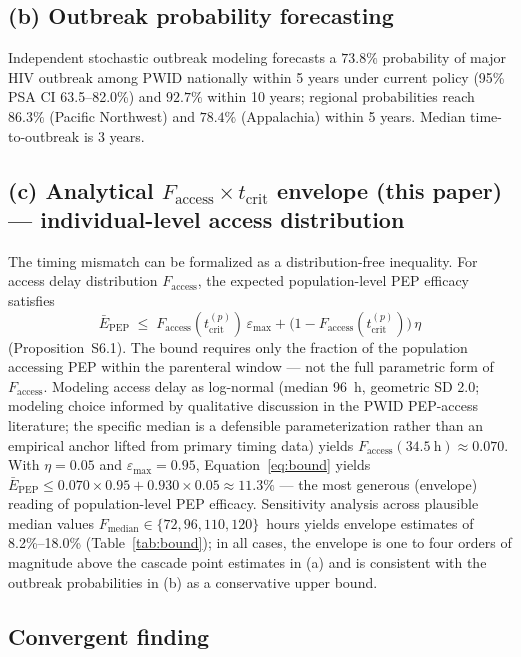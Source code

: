 \documentclass[11pt]{article}
\theoremstyle{definition}
\theoremstyle{remark}
\newcommand{\Ebarpep}{\bar{E}_{\text{PEP}}}
\newcommand{\Faccess}{F_{\text{access}}}
\newcommand{\tcrit}{t_{\text{crit}}}
\newcommand{\emax}{\varepsilon_{\max}}
\begin{document}
\subsection*{(b) Outbreak probability forecasting}

Independent stochastic outbreak modeling\cite{demidont_companion} forecasts a $73.8\%$ probability of major HIV outbreak among PWID nationally within 5 years under current policy (95\% PSA CI 63.5--82.0\%) and $92.7\%$ within 10 years; regional probabilities reach $86.3\%$ (Pacific Northwest) and $78.4\%$ (Appalachia) within 5 years. Median time-to-outbreak is 3 years.

\subsection*{(c) Analytical $\Faccess \times \tcrit$ envelope (this paper) --- individual-level access distribution}

The timing mismatch can be formalized as a distribution-free inequality. For access delay distribution $\Faccess$, the expected population-level PEP efficacy satisfies
\begin{equation}
\Ebarpep \;\leq\; \Faccess(\tcrit^{(p)})\,\emax + \big(1 - \Faccess(\tcrit^{(p)})\big)\,\eta
\label{eq:bound}
\end{equation}
(Proposition~S6.1). The bound requires only the fraction of the population accessing PEP within the parenteral window --- not the full parametric form of $\Faccess$. Modeling access delay as log-normal (median 96~h, geometric SD 2.0; modeling choice informed by qualitative discussion in the PWID PEP-access literature\cite{taylor2019,baugher2025}; the specific median is a defensible parameterization rather than an empirical anchor lifted from primary timing data) yields $\Faccess(34.5~\text{h}) \approx 0.070$. With $\eta = 0.05$ and $\emax = 0.95$, Equation~\ref{eq:bound} yields $\Ebarpep \leq 0.070 \times 0.95 + 0.930 \times 0.05 \approx 11.3\%$ --- the most generous (envelope) reading of population-level PEP efficacy. Sensitivity analysis across plausible median values $F_{\text{median}} \in \{72, 96, 110, 120\}$~hours yields envelope estimates of 8.2\%--18.0\% (Table~\ref{tab:bound}); in all cases, the envelope is one to four orders of magnitude above the cascade point estimates in (a) and is consistent with the outbreak probabilities in (b) as a conservative upper bound.

\subsection*{Convergent finding}
\end{document}
